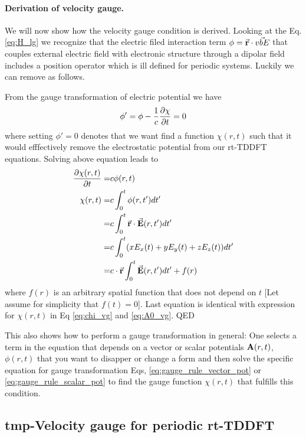 \documentclass[11pt]{article}
\begin{document}
\paragraph{ Derivation of velocity gauge.}
We will now  show how the velocity gauge condition is derived.
Looking at the Eq. \ref{eq:H_lg} we recognize that the electric filed interaction term $\phi= \vec{\vb  r}\cdot \vec{vb E}$ that couples external electric field with electronic structure through a dipolar field includes a position operator which  is ill defined for periodic systems.  Luckily we can remove as follows.

From the   gauge transformation of electric potential we have
\begin{align*}
    \phi' = \phi -\frac{1}{c} \pdv{\chi}{t}  =0
\end{align*}
where  setting $\phi'=0$  denotes  that we want  find a function $\chi(r,t)$ such that  it would efffectively remove  the electrostatic potential from our rt-TDDFT equations.
Solving above equation leads to
\begin{align*}
\pdv{\chi(r,t)}{t}  =& c \phi(r,t) \\
\chi(r,t)  =& c \int_0^t \phi(r,t')  dt' \\
           =& c \int_0^t  \vec{\vb  r}\cdot \vec{\vb E}(r,t') dt' \\
           =&   c \int_0^t (x E_x(t) +  y E_y(t) +z E_z(t)) dt' \\
            =& c \cdot \vec{\vb  r} \int_0^t \vec{\vb E}(r,t') dt' +f(r)%
\end{align*}
where $f(r)$ is an arbitrary spatial function that does not depend on $t$  [Let assume for simplicity that  $f(t)=0$].
Last  equation  is identical  with  expression for $\chi(r,t)$ in Eq \ref{eq:chi_vg} and \ref{eq:A0_vg}. QED





This also shows   how to perform a gauge transformation in general:  One selects  a term  in the equation that depends on  a vector  or scalar potentials $\vb A(r,t)$,  $\phi(r,t)$  that you want to disapper or change a form and then solve the specific equation  for gauge transformation Eqs, \ref{eq:gauge_rule_vector_pot}  or \ref{eq:gauge_rule_scalar_pot} to find the gauge function $\chi(r,t)$  that fulfills this condition.

\subsection{ tmp-Velocity gauge for periodic rt-TDDFT }
\end{document}
